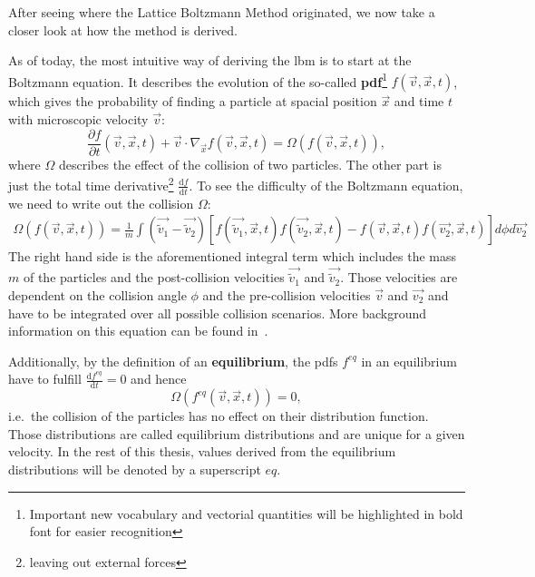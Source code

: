 After seeing where the Lattice Boltzmann Method originated, we now take a closer look at how the method is derived.

As of today, the most intuitive way of deriving the \gls{lbm} is to start at the Boltzmann equation.
It describes the evolution of the so-called \textbf{\gls{pdf}}\footnote{Important new vocabulary and vectorial quantities will be highlighted in bold font for easier recognition} $f(\vec{v},\vec{x},t)$, which gives the probability of finding a particle at spacial position $\vec{x}$ and time $t$ with microscopic velocity $\vec{v}$:
\begin{equation}
  \label{eq: Boltzmann transport equation}
  \frac{\partial f}{\partial t} (\vec{v},\vec{x},t) + \vec{v} \cdot \nabla_{\vec{x}} f(\vec{v},\vec{x},t) = \Omega\left(f(\vec{v},\vec{x},t)\right),
\end{equation}
where $\Omega$ describes the effect of the collision of two particles. The other part is just the total time derivative\footnote{leaving out external forces} $\frac{\text{d}f}{\text{d}t}$.
To see the difficulty of the Boltzmann equation, we need to write out the collision $\Omega$:
\begin{equation}
  \label{eq: Collision of boltzmann equation}
  \begin{aligned}
 \Omega\left(f(\vec{v},\vec{x},t)\right) =\frac{1}{m}
  \int \left( \vec{\tilde{v}_1}-\vec{\tilde{v}_2}\right)
  \left[
    f(\vec{\tilde{v}_1},\vec{x},t)f(\vec{\tilde{v}_2},\vec{x},t)
    -f(\vec{v},\vec{x},t)f(\vec{v_2},\vec{x},t)
  \right] d\phi d\vec{v_2}
\end{aligned}
\end{equation}
The right hand side is the aforementioned integral term which includes the mass $m$ of the particles and the post-collision velocities $\vec{\tilde{v}_1}$ and $\vec{\tilde{v}_2}$.
Those velocities are dependent on the collision angle $\phi$ and the pre-collision velocities $\vec{v}$ and $\vec{v_2}$ and have to be integrated over all possible collision scenarios.
More background information on this equation can be found in~\cite{harris2004introduction}.

Additionally, by the definition of an \textbf{equilibrium}, the \glspl{pdf} $f^{eq}$ in an equilibrium have to fulfill $\frac{\text{d}f^{eq}}{\text{d}t}=0$ and hence
\begin{equation}
  \Omega(f^{eq}(\vec{v},\vec{x},t)) = 0,
\end{equation}
i.e.\ the collision of the particles has no effect on their distribution function.
Those distributions are called equilibrium distributions and are unique for a given velocity.
In the rest of this thesis, values derived from the equilibrium distributions will be denoted by a superscript $eq$.

